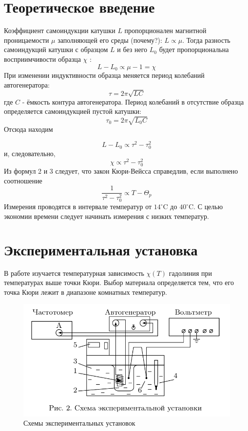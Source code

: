 \documentclass[a4paper, 12pt]{article}%
\begin{document}
\section{Теоретическое введение}


Коэффициент самоиндукции катушки $L$ пропорционален магнитной проницаемости $\mu$ заполняющей его среды (почему?): $L \propto \mu$. Тогда разность самоиндукций катушки с образцом $L$ и без него $L_{0}$ будет пропорциональна восприимчивости образца $\chi$ :
$$
L-L_{0} \propto \mu-1=\chi
$$
При изменении индуктивности образца меняется период колебаний автогенератора:
$$
\tau=2 \pi \sqrt{L C}
$$
где $C$ - ёмкость контура автогенератора. Период колебаний в отсутствие образца определяется самоиндукцией пустой катушки:
$$
\tau_{0}=2 \pi \sqrt{L_{0} C}
$$
Отсюда находим

$$
L-L_{0} \propto \tau^{2}-\tau_{0}^{2}
$$
и, следовательно,
$$
\chi \propto \tau^{2}-\tau_{0}^{2}
$$
Из формул 2 и 3 следует, что закон Кюри-Вейсса справедлив, если выполнено соотношение
$$
\frac{1}{\tau^{2}-\tau_{0}^{2}} \propto T-\Theta_{p}
$$
Измерения проводятся в интервале температур от $14^{\circ} \mathrm{C}$ до $40^{\circ} \mathrm{C}$. С целью экономии времени следует начинать измерения с низких температур.



\section{Экспериментальная установка}

В работе изучается температурная зависимость $\chi(T)$ гадолиния при температурах выше точки Кюри. Выбор материала определяется тем, что его точка Кюри лежит в диапазоне комнатных температур.

\begin{figure}[h!]
    \centering
	\includegraphics[width = \textwidth]{1.png}
    \caption{Схемы экспериментальных установок}
    \label{scheme}
\end{figure}
\end{document}
